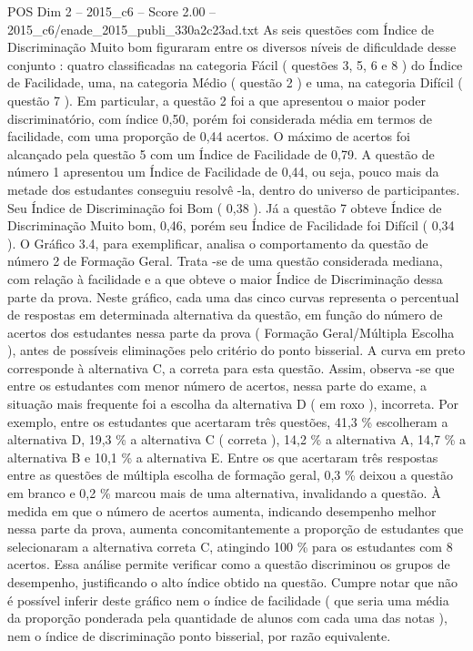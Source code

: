 \begin{textsample}{POS Dim 2 – 2015\_c6 – Score 2.00 – 2015\_c6/enade\_2015\_publi\_330a2c23ad.txt}
As seis questões com Índice de Discriminação Muito bom figuraram entre os diversos níveis de dificuldade desse conjunto : quatro classificadas na categoria Fácil ( questões 3, 5, 6 e 8 ) do Índice de Facilidade, uma, na categoria Médio ( questão 2 ) e uma, na categoria Difícil ( questão 7 ).
Em particular, a questão 2 foi a que apresentou o maior poder discriminatório, com índice 0,50, porém foi considerada média em termos de facilidade, com uma proporção de 0,44 acertos.
O máximo de acertos foi alcançado pela questão 5 com um Índice de Facilidade de 0,79.
A questão de número 1 apresentou um Índice de Facilidade de 0,44, ou seja, pouco mais da metade dos estudantes conseguiu resolvê -la, dentro do universo de participantes.
Seu Índice de Discriminação foi Bom ( 0,38 ).
Já a questão 7 obteve Índice de Discriminação Muito bom, 0,46, porém seu Índice de Facilidade foi Difícil ( 0,34 ).
O Gráfico 3.4, para exemplificar, analisa o comportamento da questão de número 2 de Formação Geral.
Trata -se de uma questão considerada mediana, com relação à facilidade e a que obteve o maior Índice de Discriminação dessa parte da prova.
Neste gráfico, cada uma das cinco curvas representa o percentual de respostas em determinada alternativa da questão, em função do número de acertos dos estudantes nessa parte da prova ( Formação Geral/Múltipla Escolha ), antes de possíveis eliminações pelo critério do ponto bisserial.
A curva em preto corresponde à alternativa C, a correta para esta questão.
Assim, observa -se que entre os estudantes com menor número de acertos, nessa parte do exame, a situação mais frequente foi a escolha da alternativa D ( em roxo ), incorreta.
Por exemplo, entre os estudantes que acertaram três questões, 41,3 \% escolheram a alternativa D, 19,3 \% a alternativa C ( correta ), 14,2 \% a alternativa A, 14,7 \% a alternativa B e 10,1 \% a alternativa E.
Entre os que acertaram três respostas entre as questões de múltipla escolha de formação geral, 0,3 \% deixou a questão em branco e 0,2 \% marcou mais de uma alternativa, invalidando a questão.
À medida em que o número de acertos aumenta, indicando desempenho melhor nessa parte da prova, aumenta concomitantemente a proporção de estudantes que selecionaram a alternativa correta C, atingindo 100 \% para os estudantes com 8 acertos.
Essa análise permite verificar como a questão discriminou os grupos de desempenho, justificando o alto índice obtido na questão.
Cumpre notar que não é possível inferir deste gráfico nem o índice de facilidade ( que seria uma média da proporção ponderada pela quantidade de alunos com cada uma das notas ), nem o índice de discriminação ponto bisserial, por razão equivalente.

\end{textsample}

